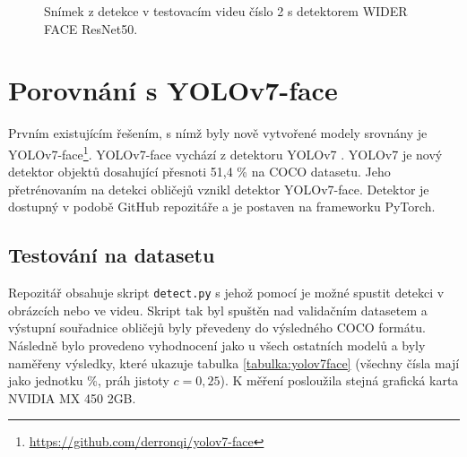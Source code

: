 \begin{figure}[H] 
  \begin{center}
  \label{obrazek:video2}
  \caption{Snímek z detekce v testovacím videu číslo 2 s detektorem WIDER FACE ResNet50.}
  \end{center}
\end{figure}



\section{Porovnání s YOLOv7-face}
\label{sekce:yolov7}
Prvním existujícím řešením, s nímž byly nově vytvořené modely srovnány je YOLOv7-face\footnote{\url{https://github.com/derronqi/yolov7-face}}. YOLOv7-face vychází z detektoru YOLOv7 \cite{yolov7}. YOLOv7 je nový detektor objektů dosahující přesnoti 51,4 \% na COCO datasetu. Jeho přetrénovaním na detekci obličejů vznikl detektor YOLOv7-face. Detektor je dostupný v podobě GitHub repozitáře a je postaven na frameworku PyTorch.

\subsection*{Testování na datasetu}
Repozitář obsahuje skript \texttt{detect.py} s jehož pomocí je možné spustit detekci v obrázcích nebo ve videu. Skript tak byl spuštěn nad validačním datasetem a výstupní souřadnice obličejů byly převedeny do výsledného COCO formátu. Následně bylo provedeno vyhodnocení jako u všech ostatních modelů a byly naměřeny výsledky, které ukazuje tabulka \ref{tabulka:yolov7face} (všechny čísla mají jako jednotku \%, práh jistoty $c=0,25$). K měření posloužila stejná grafická karta NVIDIA MX 450 2GB.

